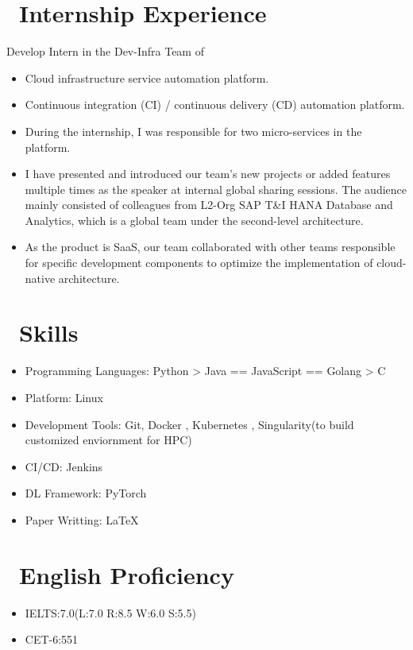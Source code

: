 \documentclass{resume}
\begin{document}
\section{\faUsers\ Internship Experience}
Develop Intern in the Dev-Infra Team of \href{(https://www.sap.com/products/technology-platform/data-intelligence.html)}{\color{blue}{SAP Data Intelligence}}
\begin{itemize}
\item Cloud infrastructure service automation platform.
\item Continuous integration (CI) / continuous delivery (CD) automation platform.
\item During the internship, I was responsible for two micro-services in the platform.
\item I have presented and introduced our team's new projects or added features multiple times as the speaker at internal global sharing sessions. The audience mainly consisted of colleagues from L2-Org SAP T\&I HANA Database and Analytics, which is a global team under the second-level architecture.
\item As the product is SaaS, our team collaborated with other teams responsible for specific development components to optimize the implementation of cloud-native architecture.
\end{itemize}

\section{\faCogs\ Skills}
\begin{itemize}[parsep=0.5ex]
  \item Programming Languages: Python > Java == JavaScript == Golang > C
  \item Platform: Linux
  \item Development Tools: Git, Docker , Kubernetes , Singularity(to build customized enviornment for HPC)
  \item CI/CD: Jenkins
  \item DL Framework: PyTorch
  \item Paper Writting: \LaTeX
\end{itemize}

\section{\faInfo\ English Proficiency}
\begin{itemize}[parsep=0.5ex]
  \item IELTS:7.0(L:7.0 R:8.5 W:6.0 S:5.5)
  \item CET-6:551
\end{itemize}
\end{document}
